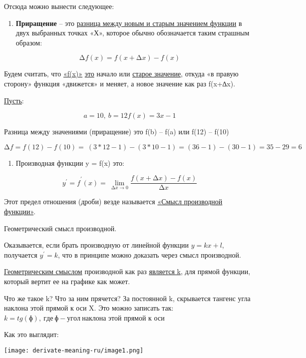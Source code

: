 \documentclass[
]{article}
\begin{document}
Отсюда можно вынести следующее:

\begin{enumerate}
\def\labelenumi{\arabic{enumi})}
\item
  \textbf{Приращение} -- это \uline{разница между новым и старым
  значением функции} в двух выбранных точках «Х», которое обычно
  обозначается таким страшным образом:
\end{enumerate}

\[\mathrm{\Delta}f(x) = f(x + \mathrm{\Delta}x) - f(x)\]

Будем считать, что \uline{«f(x)»} \uline{это} начало или \uline{старое
значение}, откуда «в правую сторону» функция «движется» и меняет, а
новое значение как раз f(x+∆x).

\uline{Пусть}:

\[{a = 10,\ b = 12
}{f(x) = 3x - 1}\]

Разница между значениями (приращение) это f(b) -- f(a) или f(12) --
f(10)

\[\mathrm{\Delta}f = f(12) - f(10) = \ (3*12 - 1) - (3*10 - 1) = (36 - 1) - (30 - 1) = 35 - 29 = 6\]

\begin{enumerate}
\def\labelenumi{\arabic{enumi})}
\setcounter{enumi}{1}
\item
  Производная функции y = f(x) это:
\end{enumerate}

\[{y^{'} = f}^{'}(x) = \ \lim_{\mathrm{\Delta}x \rightarrow 0}\frac{f(x + \mathrm{\Delta}x) - f(x)}{\mathrm{\Delta}x}\]

Этот предел отношения (дроби) везде называется \uline{«Смысл производной
функции»}.

Геометрический смысл производной.

Оказывается, если брать производную от линейной функции \(y = kx + l\),
получается \(y^{'} = k\), что в принципе можно доказать через смысл
производной.

\uline{Геометрическим смыслом} производной как раз \uline{является k},
для прямой функции, который вертит ее на графике как может.

Что же такое k? Что за ним прячется? За постоянной k, скрывается тангенс
угла наклона этой прямой к оси X. Это можно записать так:
\(k = tg(ɸ),\ где\ ɸ - угол\ наклона\) этой прямой к оси

Как это выглядит:

\texttt{[image: derivate-meaning-ru/image1.png]}
\end{document}
